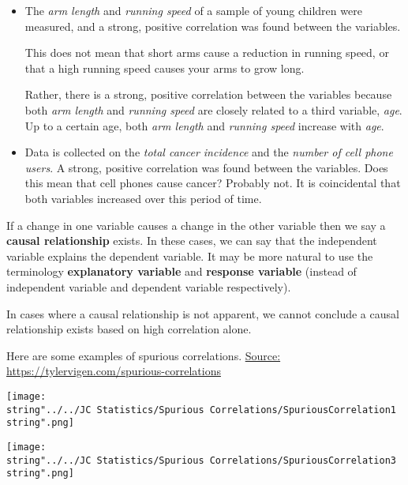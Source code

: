 \documentclass[11pt,a4paper]{book}
\begin{document}
\begin{itemize}

\item  The \textit{arm length} and \textit{running speed} of a sample
of young children were measured, and a strong, positive correlation
was found between the variables.

This does not mean that short arms cause a reduction in running speed,
or that a high running speed causes your arms to grow long.

Rather, there is a strong, positive correlation between the variables
because both \textit{arm length} and \textit{running speed} are closely
related to a third variable, \textit{age}. Up to a certain age, both
\textit{arm length} and \textit{running speed} increase with \textit{age}.

\item  Data is collected on the \textit{total cancer incidence} and
the \textit{number of cell phone users}. A strong, positive correlation
was found between the variables. Does this mean that cell phones cause
cancer? Probably not. It is coincidental that both variables increased
over this period of time.

\end{itemize}

If a change in one variable causes a change in the other variable
then we say a \textbf{causal relationship} exists. In these cases,
we can say that the independent variable explains the dependent variable.
It may be more natural to use the terminology \textbf{explanatory
variable} and \textbf{response variable} (instead of independent variable
and dependent variable respectively).

In cases where a causal relationship is not apparent, we cannot conclude
a causal relationship exists based on high correlation alone.

Here are some examples of spurious correlations. \href{https://tylervigen.com/spurious-correlations}{Source: https://tylervigen.com/spurious-correlations}
\begin{center}
\texttt{[image: \\string"../../JC Statistics/Spurious Correlations/SpuriousCorrelation1\\string".png]}
\par\end{center}


\begin{center}
\texttt{[image: \\string"../../JC Statistics/Spurious Correlations/SpuriousCorrelation3\\string".png]}
\par\end{center}
\end{document}
